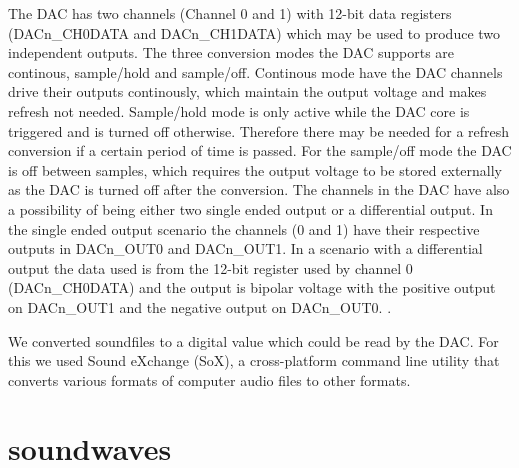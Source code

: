 The DAC has two channels (Channel 0 and 1) with 12-bit data registers
(DACn\_CH0DATA and DACn\_CH1DATA) which may be used to produce two independent
outputs. The three conversion modes the DAC supports are continous, sample/hold
and sample/off. Continous mode have the DAC channels drive their outputs
continously, which maintain the output voltage and makes refresh not needed.
Sample/hold mode is only active while the DAC core is triggered and is turned
off otherwise. Therefore there may be needed for a refresh conversion if a
certain period of time is passed. For the sample/off mode the DAC is off between
samples, which requires the output voltage to be stored externally as the DAC is
turned off after the conversion. The channels in the DAC have also a possibility
of being either two single ended output or a differential output. In the single
ended output scenario the channels (0 and 1) have their respective outputs in
DACn\_OUT0 and DACn\_OUT1. In a scenario with a differential output the data
used is from the 12-bit register used by channel 0 (DACn\_CH0DATA) and the
output is bipolar voltage with the positive output on DACn\_OUT1 and the
negative output on DACn\_OUT0. \cite{EFM32GGManual}.

We converted soundfiles to a digital value which could be read by the DAC. For
this we used Sound eXchange (SoX), a cross-platform command line utility that
converts various formats of computer audio files to other formats. \cite{SoX}

\section{soundwaves}


